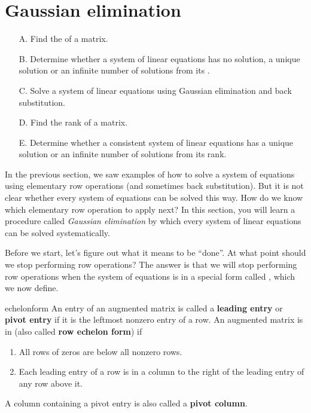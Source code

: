 \section{Gaussian elimination}

\begin{outcome}
  \begin{enumerate}
  \item[A.] Find the {\ef} of a matrix.
    
  \item[B.] Determine whether a system of linear equations has no solution, a
    unique solution or an infinite number of solutions from its {\ef}.
    
  \item[C.] Solve a system of linear equations using Gaussian
    elimination and back substitution.
    
  \item[D.] Find the rank of a matrix.
    
  \item[E.] Determine whether a consistent system of linear equations
    has a unique solution or an infinite number of solutions from its rank.  
  \end{enumerate}
\end{outcome}

In the previous section, we saw examples of how to solve a system of
equations using elementary row operations (and sometimes back
substitution). But it is not clear whether every system of equations
can be solved this way. How do we know which elementary row operation
to apply next? In this section, you will learn a procedure called {\em
  Gaussian elimination} by which every system of linear equations can
be solved systematically.

Before we start, let's figure out what it means to be ``done''. At
what point should we stop performing row operations? The answer is
that we will stop performing row operations when the system of
equations is in a special form called {\em {\ef}}, which we now define.

\begin{definition}{\Ef}{echelonform}
  An entry of an augmented matrix is called a
  \textbf{leading entry} or
  \textbf{pivot entry}
  if it is the leftmost nonzero entry of a row. 
  An augmented matrix is in
  \textbf{\ef}\eindex{\ef}
  (also called \textbf{row echelon form}) if
  \begin{enumerate}
  \item All rows of zeros are below all nonzero rows.
    
  \item Each leading entry of a row is in a column to the right of the
    leading entry of any row above it.
  \end{enumerate}
  A column containing a pivot entry is also called a
  \textbf{pivot column}.
\end{definition}

